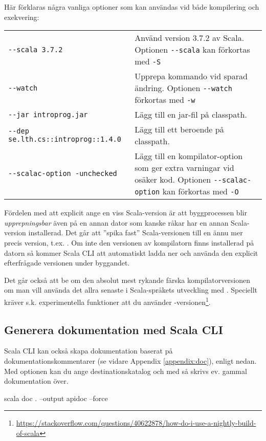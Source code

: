 \noindent Här förklaras några vanliga optioner som kan användas vid både kompilering och exekvering: 
\begin{table}[H]
\begin{tabular}{l p{6.5cm}}
\texttt{-{}-scala 3.7.2} & Använd version 3.7.2 av Scala. Optionen \texttt{-{}-scala} kan förkortas med \texttt{-S} \\
\texttt{-{}-watch} & Upprepa kommando vid sparad ändring. Optionen \texttt{-{}-watch} förkortas med \texttt{-w} \\
\texttt{-{}-jar introprog.jar} & Lägg till en jar-fil på classpath. \\
\texttt{-{}-dep se.lth.cs::introprog::1.4.0} & Lägg till ett beroende på classpath. \\
\texttt{-{}-scalac-option -unchecked} & Lägg till en kompilator-option som ger extra varningar vid osäker kod.  Optionen \texttt{-{}-scalac-option} kan förkortas med \texttt{-O}\\
\end{tabular}
\end{table}

\noindent Fördelen med att explicit ange en viss Scala-version är att byggprocessen blir \emph{upprepningsbar} även på en annan dator som kanske råkar har en annan Scala-version installerad. Det går att ''spika fast'' Scala-versionen till en ännu mer precis version, t.ex. . Om inte den versionen av kompilatorn finns installerad på datorn så kommer Scala CLI att automatiskt ladda ner och använda den explicit efterfrågade versionen under byggandet.

Det går också att be om den absolut mest rykande färska kompilatorversionen om man vill använda det allra senaste i Scala-språkets utveckling med . Speciellt kräver s.k. experimentella funktioner att du använder -versionen\footnote{\url{https://stackoverflow.com/questions/40622878/how-do-i-use-a-nightly-build-of-scala}}. 

\subsection{Generera dokumentation med Scala CLI}

Scala CLI kan också skapa dokumentation baserat på dokumentationskommentarer (se vidare Appendix \ref{appendix:doc}), enligt nedan. Med optionen  kan du ange destinationskatalog och med  så skrivs ev. gammal dokumentation över.
\begin{REPLsmall}
scala doc . --output apidoc --force
\end{REPLsmall}

